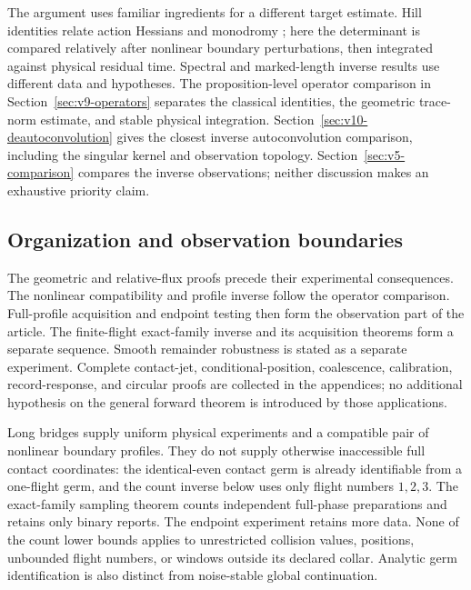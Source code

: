 The argument uses familiar ingredients for a different target estimate.
Hill identities relate action Hessians and monodromy \cite{Hill}; here
the determinant is compared relatively after nonlinear boundary
perturbations, then integrated against physical residual time. Spectral
and marked-length inverse results \cite{Zelditch,DSKL,FinamoreLeguil}
use different data and hypotheses. The proposition-level operator comparison in
Section~\ref{sec:v9-operators} separates the classical identities,
the geometric trace-norm estimate, and stable physical integration.
Section~\ref{sec:v10-deautoconvolution} gives the closest inverse
autoconvolution comparison, including the singular kernel and observation
topology. Section~\ref{sec:v5-comparison} compares the inverse observations;
neither discussion makes an exhaustive priority claim.

\subsection{Organization and observation boundaries}
The geometric and relative-flux proofs precede their experimental
consequences. The nonlinear compatibility and profile inverse follow the
operator comparison. Full-profile acquisition and endpoint testing then
form the observation part of the article. The
finite-flight exact-family inverse and its acquisition theorems form
a separate sequence. Smooth remainder robustness is stated as
a separate experiment. Complete contact-jet, conditional-position,
coalescence, calibration, record-response, and circular proofs are
collected in the appendices; no additional hypothesis on the general
forward theorem is introduced by those applications.

Long bridges supply uniform physical experiments and a compatible
pair of nonlinear boundary profiles. They do not supply otherwise
inaccessible full contact coordinates: the identical-even
contact germ is already identifiable from a one-flight germ, and the
count inverse below uses only flight numbers $1,2,3$. The exact-family
sampling theorem counts independent full-phase preparations and retains
only binary reports. The endpoint experiment retains more data. None of
the count lower bounds applies to unrestricted collision values,
positions, unbounded flight numbers, or windows outside its declared
collar. Analytic germ identification is also distinct from noise-stable
global continuation.

